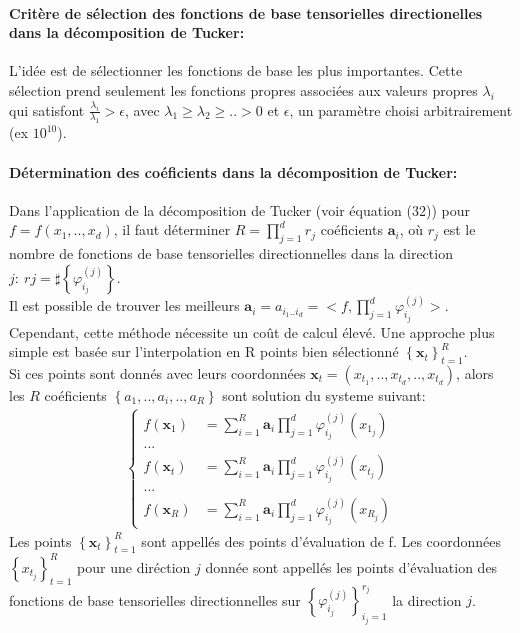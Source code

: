 \paragraph{Critère de sélection des fonctions de base tensorielles directionelles dans la décomposition de Tucker:\\}
\hspace{0.5cm} L'idée est de sélectionner les fonctions de base les plus importantes. Cette sélection prend seulement les fonctions propres associées aux valeurs propres $\lambda_i$ qui satisfont $\frac{\lambda_i}{\lambda_1}>\epsilon$,
avec $\lambda_1 \geq \lambda_2 \geq .. > 0$ et $\epsilon$, un paramètre choisi arbitrairement (ex $10^{10}$).

\paragraph{Détermination des coéficients dans la décomposition de Tucker:\\}
\hspace{0.5cm} Dans l'application de la décomposition de Tucker (voir équation (32)) pour $f = f(x_1,..,x_d)$, il faut déterminer $R = \prod_{j=1}^d r_j$ coéficients $\mathbf{a}_i$, où $r_j$ est le nombre de fonctions de base
tensorielles directionnelles dans la direction $j:\ rj = \sharp\left \{ \varphi_{i_j}^{(j)} \right \}$.\\
Il est possible de trouver les meilleurs $\mathbf{a}_i = a_{i_1..i_d} = <f,\prod_{j=1}^d \varphi_{i_j}^{(j)} >$.
Cependant, cette méthode nécessite un coût de calcul élevé. Une approche plus simple est basée sur l'interpolation en R points bien sélectionné $\left \{ \mathbf{x}_t \right \}_{t=1}^R$.\\
Si ces points sont donnés avec leurs coordonnées $\mathbf{x}_t = (x_{t_1}, .., x_{t_d}, .., x_{t_d})$, alors les $R$ coéficients $\left \{a_1,.., a_i,..,a_R  \right \}$ sont solution du systeme suivant:
\begin{align}
		\left\{\begin{matrix}
		f(\mathbf{x}_1) & = \sum_{i=1}^R \mathbf{a}_i \prod_{j=1}^d \varphi_{i_j}^{(j)} (x_{1_j})\\
		 ... \\
		f(\mathbf{x}_t) & = \sum_{i=1}^R \mathbf{a}_i \prod_{j=1}^d \varphi_{i_j}^{(j)} (x_{t_j})\\
		 ... \\
		f(\mathbf{x}_R) & = \sum_{i=1}^R \mathbf{a}_i \prod_{j=1}^d \varphi_{i_j}^{(j)} (x_{R_j})
		\end{matrix}\right.
\end{align}
Les points $\left \{ \mathbf{x}_t \right \}_{t=1}^R$ sont appellés des points d'évaluation de f. Les coordonnées $\left \{ x_{t_j} \right \}_{t=1}^R$ pour une diréction $j$ donnée sont appellés
les points d'évaluation des fonctions de base tensorielles directionnelles sur $\left \{ \varphi_{i_j}^{(j)} \right \}_{i_j=1}^{r_j}$ la direction $j$.
\newpage


